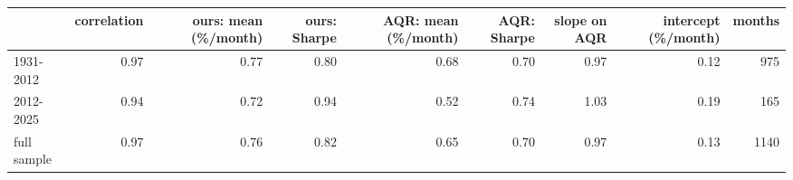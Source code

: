 \begin{tabular}{lrrrrrrrr}
\toprule
 & correlation & ours: mean (\%/month) & ours: Sharpe & AQR: mean (\%/month) & AQR: Sharpe & slope on AQR & intercept (\%/month) & months \\
\midrule
1931-2012 & 0.97 & 0.77 & 0.80 & 0.68 & 0.70 & 0.97 & 0.12 & 975 \\
2012-2025 & 0.94 & 0.72 & 0.94 & 0.52 & 0.74 & 1.03 & 0.19 & 165 \\
full sample & 0.97 & 0.76 & 0.82 & 0.65 & 0.70 & 0.97 & 0.13 & 1140 \\
\bottomrule
\end{tabular}
